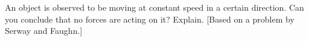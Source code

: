  An object is observed to be moving at constant speed in a
certain direction. Can you conclude that no forces are
acting on it? Explain. [Based on a problem by Serway and Faughn.]
